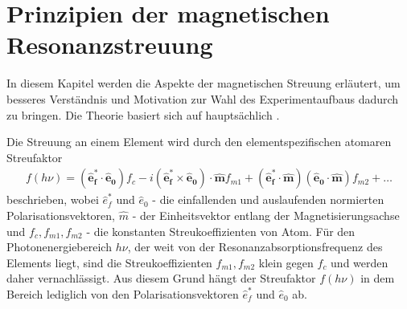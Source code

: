 \chapter{Prinzipien der magnetischen Resonanzstreuung}
\label{text:streuung}
In diesem Kapitel werden die Aspekte der magnetischen Streuung erläutert, um besseres Verständnis und Motivation zur Wahl des Experimentaufbaus dadurch zu bringen. Die Theorie basiert sich auf hauptsächlich \cite{kortright_resonant_2013}. 


\noindent
Die Streuung an einem Element wird durch den elementspezifischen atomaren Streufaktor
\begin{align}
f(h\nu) = (\mathbf{\hat{e}_f^*} \cdot \mathbf{\hat{e}_0})f_c - i(\mathbf{\hat{e}_f^*} \times \mathbf{\hat{e}_0})\cdot\mathbf{\hat{m}}f_{m1}+(\mathbf{\hat{e}_f^*} \cdot \mathbf{\hat{m}})(\mathbf{\hat{e}_0}\cdot\mathbf{\hat{m}})f_{m2} + \dots
\end{align}
beschrieben, wobei $\hat{e}_f^*$ und $\hat{e}_0$ - die einfallenden und auslaufenden normierten Polarisationsvektoren, $\hat{m}$ - der Einheitsvektor entlang der Magnetisierungsachse und $f_c, f_{m1}, f_{m2}$ - die konstanten Streukoeffizienten von Atom. Für den Photonenergiebereich $h\nu$, der weit von der Resonanzabsorptionsfrequenz des Elements liegt, sind die Streukoeffizienten  $f_{m1}, f_{m2}$ klein gegen $f_c$ und werden daher vernachlässigt. Aus diesem Grund hängt der Streufaktor $f(h\nu)$ in dem Bereich lediglich von den Polarisationsvektoren $\hat{e}_f^*$ und $\hat{e}_0$ ab.

